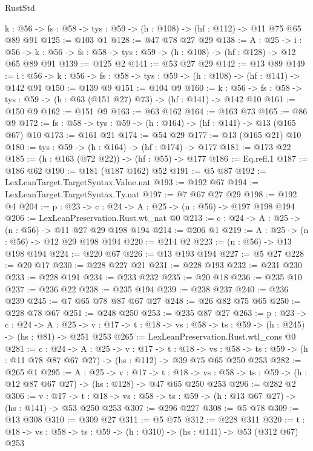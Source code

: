 \begin{lexlean}{RustStd}
\begin{coremodule}
{\begin{coremodule}
{  {k : @56} -> {fs : @58} -> {tys : @59} -> (h : @108) -> (hf : @112) -> @11 @75 @65 @89 @91
@125 := @103 @1
@128 := @47 @78 @27 @29
@138 := {A : @25} ->
  {i : @56} ->
  {k : @56} -> {fs : @58} -> {tys : @59} -> (h : @108) -> (hf : @128) -> @12 @65 @89 @91
@139 := @125 @2
@141 := @53 @27 @29
@142 := @13 @89
@149 := {i : @56} -> {k : @56} -> {fs : @58} -> {tys : @59} -> (h : @108) -> (hf : @141) -> @142 @91
@150 := @139 @9
@151 := @104 @9
@160 := {k : @56} ->
  {fs : @58} -> {tys : @59} -> (h : @63 (@151 @27) @73) -> (hf : @141) -> @142 @10
@161 := @150 @9
@162 := @151 @9
@163 := @63 @162
@164 := @163 @73
@165 := @86 @9
@172 := {fs : @58} -> {tys : @59} -> (h : @164) -> (hf : @141) -> @13 (@165 @67) @10
@173 := @161 @21
@174 := @54 @29
@177 := @13 (@165 @21) @10
@180 := {tys : @59} -> (h : @164) -> (hf : @174) -> @177
@181 := @173 @22
@185 := (h : @163 (@72 @22)) -> (hf : @55) -> @177
@186 := Eq.refl.{1}
@187 := @186 @62
@190 := @181 (@187 @162) @52
@191 := @5 @87
@192 := LexLeanTarget.TargetSyntax.Value.nat
@193 := @192 @67
@194 := LexLeanTarget.TargetSyntax.Ty.nat
@197 := @7 @67 @27 @29
@198 := @192 @4
@204 := {p : @23} -> {c : @24} -> {A : @25} -> (n : @56) -> @197 @198 @194
@206 := LexLeanPreservation.Rust.wt_nat @0
@213 := {c : @24} -> {A : @25} -> (n : @56) -> @11 @27 @29 @198 @194
@214 := @206 @1
@219 := {A : @25} -> (n : @56) -> @12 @29 @198 @194
@220 := @214 @2
@223 := (n : @56) -> @13 @198 @194
@224 := @220 @67
@226 := @13 @193 @194
@227 := @5 @27
@228 := @20 @17
@230 := @228 @227 @21
@231 := @228 @193
@232 := @231 @230
@233 := @228 @191
@234 := @233 @232
@235 := @20 @18
@236 := @235 @10
@237 := @236 @22
@238 := @235 @194
@239 := @238 @237
@240 := @236 @239
@245 := @7 @65 @78 @87 @67 @27
@248 := @26 @82 @75 @65
@250 := @228 @78 @67
@251 := @248 @250
@253 := @235 @87 @27
@263 := {p : @23} ->
  {c : @24} ->
  {A : @25} ->
  {v : @17} -> {t : @18} -> {vs : @58} -> {ts : @59} -> (h : @245) -> (hs : @81) -> @251 @253
@265 := LexLeanPreservation.Rust.wtl_cons @0
@281 := {c : @24} ->
  {A : @25} ->
  {v : @17} ->
  {t : @18} ->
  {vs : @58} -> {ts : @59} -> (h : @11 @78 @87 @67 @27) -> (hs : @112) -> @39 @75 @65 @250 @253
@282 := @265 @1
@295 := {A : @25} ->
  {v : @17} ->
  {t : @18} -> {vs : @58} -> {ts : @59} -> (h : @12 @87 @67 @27) -> (hs : @128) -> @47 @65 @250 @253
@296 := @282 @2
@306 := {v : @17} ->
  {t : @18} -> {vs : @58} -> {ts : @59} -> (h : @13 @67 @27) -> (hs : @141) -> @53 @250 @253
@307 := @296 @227
@308 := @5 @78
@309 := @13 @308
@310 := @309 @27
@311 := @5 @75
@312 := @228 @311
@320 := {t : @18} -> {vs : @58} -> {ts : @59} -> (h : @310) -> (hs : @141) -> @53 (@312 @67) @253
}
\end{coremodule}}
\end{coremodule}
\end{lexlean}
